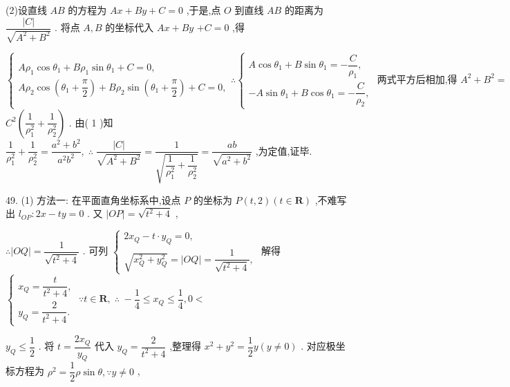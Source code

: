 (2)设直线 ${AB}$ 的方程为 ${Ax} + {By} + C = 0$ ,于是,点 $O$ 到直线 ${AB}$ 的距离为 $\dfrac{\left| C\right| }{\sqrt{{A}^{2} + {B}^{2}}}$ . 将点 $A,B$ 的坐标代入 ${Ax} + {By}$  $+ C = 0$ ,得

$\left\{  {\begin{array}{l} A{\rho }_{1}\cos {\theta }_{1} + B{\rho }_{1}\sin {\theta }_{1} + C = 0, \\  A{\rho }_{2}\cos \left( {{\theta }_{1} + \dfrac{\pi }{2}}\right)  + B{\rho }_{2}\sin \left( {{\theta }_{1} + \dfrac{\pi }{2}}\right)  + C = 0, \end{array}\therefore \left\{  {\begin{array}{l} A\cos {\theta }_{1} + B\sin {\theta }_{1} =  - \dfrac{C}{{\rho }_{1}}, \\   - A\sin {\theta }_{1} + B\cos {\theta }_{1} =  - \dfrac{C}{{\rho }_{2}}, \end{array}\text{ 两式平方后相加,得 }{A}^{2} + {B}^{2} = }\right. }\right.$  ${C}^{2}\left( {\dfrac{1}{{\rho }_{1}^{2}} + \dfrac{1}{{\rho }_{2}^{2}}}\right)$ . 由( 1 )知 $\dfrac{1}{{\rho }_{1}^{2}} + \dfrac{1}{{\rho }_{2}^{2}} = \dfrac{{a}^{2} + {b}^{2}}{{a}^{2}{b}^{2}},\;\therefore \;\dfrac{\left| C\right| }{\sqrt{{A}^{2} + {B}^{2}}} = \dfrac{1}{\sqrt{\dfrac{1}{{\rho }_{1}^{2}} + \dfrac{1}{{\rho }_{2}^{2}}}} = \dfrac{ab}{\sqrt{{a}^{2} + {b}^{2}}}$ ,为定值,证毕.

49. (1) 方法一: 在平面直角坐标系中,设点 $P$ 的坐标为 $P\left( {t,2}\right) \left( {t \in  \mathbf{R}}\right)$ ,不难写出 ${l}_{OP} : {2x} - {ty} = 0$ . 又 $\left| {OP}\right|  = \sqrt{{t}^{2} + 4}$ ,

$\therefore \left| {OQ}\right|  = \dfrac{1}{\sqrt{{t}^{2} + 4}}$ . 可列 $\left\{  \begin{array}{l} 2{x}_{Q} - t \cdot  {y}_{Q} = 0, \\  \sqrt{{x}_{Q}^{2} + {y}_{Q}^{2}} = \left| {OQ}\right|  = \dfrac{1}{\sqrt{{t}^{2} + 4}}, \end{array}\right.$ 解得 $\left\{  {\begin{array}{l} {x}_{Q} = \dfrac{t}{{t}^{2} + 4}, \\  {y}_{Q} = \dfrac{2}{{t}^{2} + 4}. \end{array}\;\because t \in  \mathbf{R},\;\therefore \; - \dfrac{1}{4} \leq  {x}_{Q} \leq  \dfrac{1}{4},0 < }\right.$

${y}_{Q} \leq  \dfrac{1}{2}$ . 将 $t = \dfrac{2{x}_{Q}}{{y}_{Q}}$ 代入 ${y}_{Q} = \dfrac{2}{{t}^{2} + 4}$ ,整理得 ${x}^{2} + {y}^{2} = \dfrac{1}{2}y\left( {y \neq  0}\right)$ . 对应极坐标方程为 ${\rho }^{2} = \dfrac{1}{2}\rho \sin \theta ,\because y \neq  0$ ,

